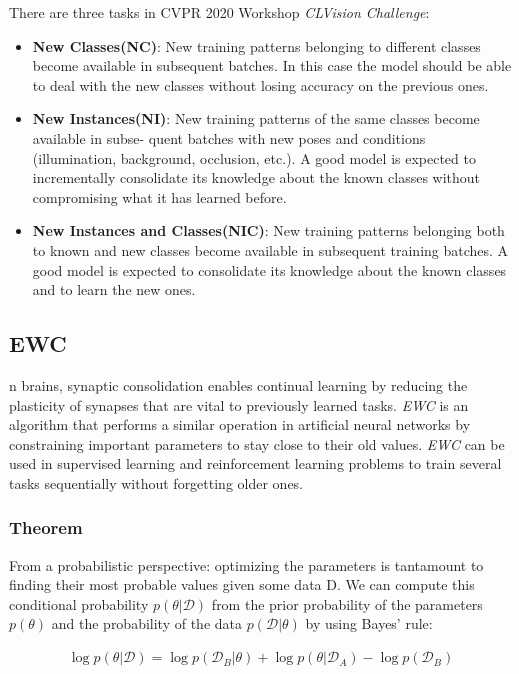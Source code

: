 There are three tasks in CVPR 2020 Workshop \textit{CLVision Challenge}:
\begin{itemize}
\item \textbf{New Classes(NC)}: New training patterns belonging to different classes become available in subsequent batches. In this case the model should be able to deal with the new classes without losing accuracy on the previous ones.
\item \textbf{New Instances(NI)}: New training patterns of the same classes become available in subse- quent batches with new poses and conditions (illumination, background, occlusion, etc.). A good model is expected to incrementally consolidate its knowledge about the known classes without compromising what it has learned before.
\item \textbf{New Instances and Classes(NIC)}: New training patterns belonging both to known and new classes become available in subsequent training batches. A good model is expected to consolidate its knowledge about the known classes and to learn the new ones.
\end{itemize} 

\subsection{EWC}
n brains, synaptic consolidation enables continual learning by reducing the plasticity of synapses that are vital to previously learned tasks.  \textit{EWC} is an algorithm that performs a similar operation in artificial neural networks by constraining important parameters to stay close to their old values. \textit{EWC} can be used in supervised learning and reinforcement learning problems to train several tasks sequentially without forgetting older ones.

\subsubsection{Theorem}
From a probabilistic perspective: optimizing the parameters is tantamount to finding their most probable values given some data D. We can compute this conditional probability $p(\theta | \mathcal{D})$ from the prior probability of the parameters $p(\theta)$ and the probability of the data $p(\mathcal{D}|\theta)$ by using Bayes’ rule:

\begin{equation}
\begin{aligned}
\log p(\theta | \mathcal{D})=\log p\left(\mathcal{D}_{B} | \theta\right)+\log p\left(\theta | \mathcal{D}_{A}\right)-\log p\left(\mathcal{D}_{B}\right)
\end{aligned}
\end{equation}

